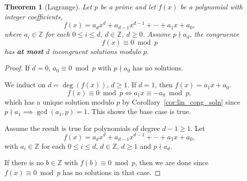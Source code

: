 \documentclass{amsbook}
\theoremstyle{plain}
\newtheorem{theorem}{Theorem}[chapter] %
\theoremstyle{definition}
\theoremstyle{remark}
\numberwithin{equation}{chapter}
\numberwithin{figure}{chapter}
\newcommand{\Z}{\mathbb{Z}}
\begin{document}
\begin{theorem}[Lagrange]\label{thm:lagrange}
  Let $p$ be a prime and let $f(x)$ be a polynomial with integer coefficients,
  \[
    f(x) = a_d x^d + a_{d-1} x^{d-1} + \cdots + a_1 x + a_0,
  \]
  where $a_i \in \Z$ for each $0 \leqslant i \leqslant d$, $d \in \Z$, $d \geqslant 0$. Assume $p \nmid a_d$, the congruence
  \[
    f(x) \equiv 0 \bmod p
  \]
  has \textbf{at most} $d$ incongruent solutions modulo $p$.
\end{theorem}
\begin{proof}
  If $d = 0$, $a_0 \equiv 0 \bmod p$ with $p \nmid a_0$ has no solutions.
  
  We induct on $d = \deg (f(x))$, $d \geqslant 1$. If $d = 1$, then $f(x) = a_1 x + a_0$.
  \[
    f(x) \equiv 0 \bmod p \iff a_1 x \equiv -a_0 \bmod p,
  \]
  which has a unique solution modulo $p$ by Corollary~\ref{cor:lin_cong_soln} since $p \nmid a_1 \implies \gcd (a_1, p) = 1$. This shows the base case is true.

  Assume the result is true for polynomials of degree $d - 1 \geqslant 1$. Let 
  \[
    f(x) = a_d x^d + a_{d-1} x^{d-1} + \cdots + a_1 x + a_0,
  \]
  with $a_i \in \Z$ for each $0 \leqslant i \leqslant d$, $d \in \Z$, $d \geqslant 1$ and $p \nmid a_d$.

  If there is no $b \in \Z$ with $f(b) \equiv 0 \bmod p$, then we are done since $f(x) \equiv 0 \bmod p$ has no solutions in that case.


\end{proof}
\end{document}
